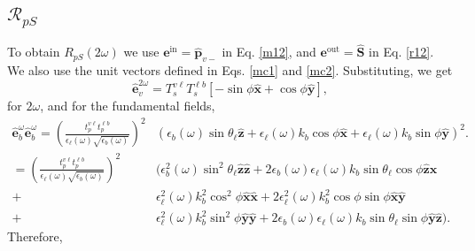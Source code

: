 \documentclass[10pt]{article}
\begin{document}
\subsection{\texorpdfstring{$\mathcal{R}_{pS}$}{RpS}}

To obtain $R_{pS}(2\omega)$ we use
$\mathbf{e}^{\mathrm{in}}=\hat{\mathbf{p}}_{v-}$ in Eq. \eqref{m12}, and
$\mathbf{e}^{\mathrm{out}}=\hat{\mathbf{S}}$ in Eq. \eqref{r12}. We also use
the unit vectors defined in Eqs. \eqref{mc1} and
\eqref{mc2}. Substituting, we get
\begin{equation*}
\hat{\mathbf{e}}^{2\omega}_{v} 
= T^{v\ell}_{s}T^{\ell b}_{s}
\left[-\sin\phi\hat{\mathbf{x}} + \cos\phi\hat{\mathbf{y}}\right],
\end{equation*}
for $2\omega$, and for the fundamental fields,
\begin{align*}
\hat{\mathbf{e}}^{\omega}_{b}\hat{\mathbf{e}}^{\omega}_{b}
= \left(
\frac{t^{v\ell}_{p}t^{\ell b}_{p}}
       {\epsilon_{\ell}(\omega)\sqrt{\epsilon_{b}(\omega)}}
\right)^{2}
&\left(
  \epsilon_{b}(\omega)\sin\theta_{\ell}\hat{\mathbf{z}}
+ \epsilon_{\ell}(\omega)k_{b}\cos\phi\hat{\mathbf{x}}
+ \epsilon_{\ell}(\omega)k_{b}\sin\phi\hat{\mathbf{y}}
\right)^{2}.\\
= \left(
\frac{t^{v\ell}_{p}t^{\ell b}_{p}}
       {\epsilon_{\ell}(\omega)\sqrt{\epsilon_{b}(\omega)}}
\right)^{2}
&\big(
  \epsilon_{b}^{2}(\omega)\sin^{2}\theta_{\ell}\hat{\mathbf{z}}\hat{\mathbf{z}}
+ 2\epsilon_{b}(\omega)\epsilon_{\ell}(\omega)k_{b}\sin\theta_{\ell}
   \cos\phi\hat{\mathbf{z}}\hat{\mathbf{x}}\\
+ &\epsilon^{2}_{\ell}(\omega)k^{2}_{b}\cos^{2}\phi
   \hat{\mathbf{x}}\hat{\mathbf{x}}
+ 2\epsilon^{2}_{\ell}(\omega)k^{2}_{b}\cos\phi\sin\phi
   \hat{\mathbf{x}}\hat{\mathbf{y}}\\
+ &\epsilon^{2}_{\ell}(\omega)k^{2}_{b}\sin^{2}\phi
   \hat{\mathbf{y}}\hat{\mathbf{y}}
+ 2\epsilon_{b}(\omega)\epsilon_{\ell}(\omega)k_{b}\sin\theta_{\ell}\sin\phi
   \hat{\mathbf{y}}\hat{\mathbf{z}}
\big).
\end{align*}
Therefore,
\end{document}
